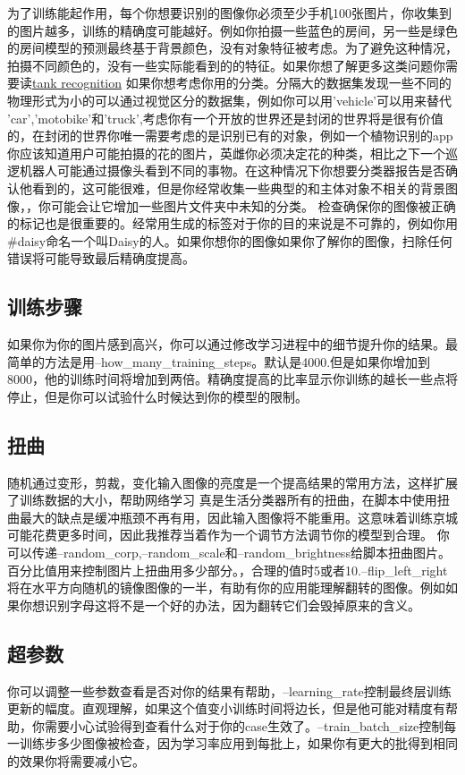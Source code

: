 为了训练能起作用，每个你想要识别的图像你必须至少手机100张图片，你收集到的图片越多，训练的精确度可能越好。例如你拍摄一些蓝色的房间，另一些是绿色的房间模型的预测最终基于背景颜色，没有对象特征被考虑。为了避免这种情况，拍摄不同颜色的，没有一些实际能看到的的特征。如果你想了解更多这类问题你需要读\href{http://www.jefftk.com/p/detecting-tanks}{tank recognition}
如果你想考虑你用的分类。分隔大的数据集发现一些不同的物理形式为小的可以通过视觉区分的数据集，例如你可以用'vehicle'可以用来替代
'car','motobike'和'truck',考虑你有一个开放的世界还是封闭的世界将是很有价值的，在封闭的世界你唯一需要考虑的是识别已有的对象，例如一个植物识别的app你应该知道用户可能拍摄的花的图片，英雌你必须决定花的种类，相比之下一个巡逻机器人可能通过摄像头看到不同的事物。在这种情况下你想要分类器报告是否确认他看到的，这可能很难，但是你经常收集一些典型的和主体对象不相关的背景图像，，你可能会让它增加一些图片文件夹中未知的分类。
检查确保你的图像被正确的标记也是很重要的。经常用生成的标签对于你的目的来说是不可靠的，例如你用\#daisy命名一个叫Daisy的人。如果你想你的图像如果你了解你的图像，扫除任何错误将可能导致最后精确度提高。
\subsection{训练步骤}
如果你为你的图片感到高兴，你可以通过修改学习进程中的细节提升你的结果。最简单的方法是用--how\_many\_training\_steps。默认是4000.但是如果你增加到8000，他的训练时间将增加到两倍。精确度提高的比率显示你训练的越长一些点将停止，但是你可以试验什么时候达到你的模型的限制。
\subsection{扭曲}
随机通过变形，剪裁，变化输入图像的亮度是一个提高结果的常用方法，这样扩展了训练数据的大小，帮助网络学习
真是生活分类器所有的扭曲，在脚本中使用扭曲最大的缺点是缓冲瓶颈不再有用，因此输入图像将不能重用。这意味着训练京城可能花费更多时间，因此我推荐当着作为一个调节方法调节你的模型到合理。
你可以传递--random\_corp,--random\_scale和--random\_brightness给脚本扭曲图片。百分比值用来控制图片上扭曲用多少部分。，合理的值时5或者10.--flip\_left\_right将在水平方向随机的镜像图像的一半，有助有你的应用能理解翻转的图像。例如如果你想识别字母这将不是一个好的办法，因为翻转它们会毁掉原来的含义。
\subsection{超参数}
你可以调整一些参数查看是否对你的结果有帮助，--learning\_rate控制最终层训练更新的幅度。直观理解，如果这个值变小训练时间将边长，但是他可能对精度有帮助，你需要小心试验得到查看什么对于你的case生效了。--train\_batch\_size控制每一训练步多少图像被检查，因为学习率应用到每批上，如果你有更大的批得到相同的效果你将需要减小它。
